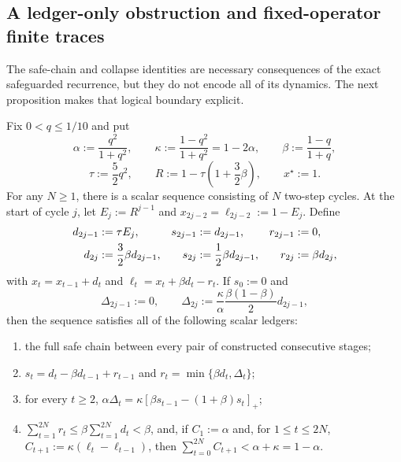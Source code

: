 \subsection{A ledger-only obstruction and fixed-operator finite traces}

The safe-chain and collapse identities are necessary consequences of the
exact safeguarded recurrence, but they do not encode all of its dynamics.  The
next proposition makes that logical boundary explicit.

\begin{proposition}
\label{prop:aesp-cd-ledger-only-insufficient}
Fix $0<q\leq1/10$ and put
\begin{equation}
 \alpha:=\frac{q^2}{1+q^2},\qquad
 \kappa:=\frac{1-q^2}{1+q^2}=1-2\alpha,\qquad
 \beta:=\frac{1-q}{1+q},
 \label{eq:aesp-cd-ledger-countermodel-parameters}
\end{equation}
\begin{equation*}
 \tau:=\frac52q^2,\qquad
 R:=1-\tau\left(1+\frac32\beta\right),\qquad
 x^\star:=1.
\end{equation*}
For any $N\geq1$, there is a scalar sequence consisting of $N$ two-step
cycles.  At the start of cycle $j$, let $E_j:=R^{j-1}$ and
$x_{2j-2}=\ell_{2j-2}:=1-E_j$.  Define
\begin{align}
 d_{2j-1}&:=\tau E_j,
 &s_{2j-1}&:=d_{2j-1},
 &r_{2j-1}&:=0,\notag\\
 d_{2j}&:=\frac32\beta d_{2j-1},
 &s_{2j}&:=\frac12\beta d_{2j-1},
 &r_{2j}&:=\beta d_{2j},
 \label{eq:aesp-cd-ledger-countermodel-cycle}
\end{align}
with $x_t=x_{t-1}+d_t$ and
$\ell_t=x_t+\beta d_t-r_t$.  If $s_0:=0$ and
\begin{equation}
 \Delta_{2j-1}:=0,
 \qquad
 \Delta_{2j}:=\frac{\kappa}{\alpha}
       \frac{\beta(1-\beta)}2d_{2j-1},
 \label{eq:aesp-cd-ledger-countermodel-collapse}
\end{equation}
then the sequence satisfies all of the following scalar ledgers:
\begin{enumerate}
 \item the full safe chain between every pair of constructed consecutive
       stages;
 \item $s_t=d_t-\beta d_{t-1}+r_{t-1}$ and
       $r_t=\min\{\beta d_t,\Delta_t\}$;
 \item for every $t\geq2$,
       $\alpha\Delta_t=\kappa
       [\beta s_{t-1}-(1+\beta)s_t]_+$;
 \item $\sum_{t=1}^{2N}r_t\leq
       \beta\sum_{t=1}^{2N}d_t<\beta$, and, if
       $C_1:=\alpha$ and, for $1\leq t\leq2N$,
       $C_{t+1}:=\kappa(\ell_t-\ell_{t-1})$, then
       $\sum_{t=0}^{2N}C_{t+1}<\alpha+\kappa=1-\alpha$.
\end{enumerate}


\end{proposition}
